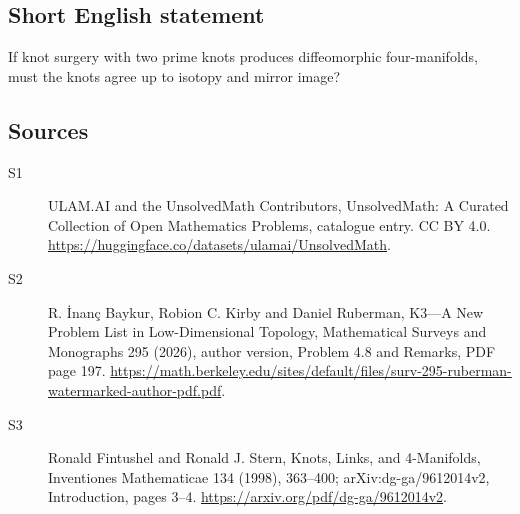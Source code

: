 \documentclass[11pt]{article}
\begin{document}
\subsection{Short English statement}
If knot surgery with two prime knots produces diffeomorphic four-manifolds, must the knots agree up to isotopy and mirror image?
\subsection{Sources}
\begin{description}
\item[\hypertarget{source:statement:1}{S1}] ULAM.AI and the UnsolvedMath Contributors, UnsolvedMath: A Curated Collection of Open Mathematics Problems, catalogue entry. CC BY 4.0. \url{https://huggingface.co/datasets/ulamai/UnsolvedMath}.
\item[\hypertarget{source:statement:2}{S2}] R. İnanç Baykur, Robion C. Kirby and Daniel Ruberman, K3—A New Problem List in Low-Dimensional Topology, Mathematical Surveys and Monographs 295 (2026), author version, Problem 4.8 and Remarks, PDF page 197. \url{https://math.berkeley.edu/sites/default/files/surv-295-ruberman-watermarked-author-pdf.pdf}.
\item[\hypertarget{source:statement:3}{S3}] Ronald Fintushel and Ronald J. Stern, Knots, Links, and 4-Manifolds, Inventiones Mathematicae 134 (1998), 363--400; arXiv:dg-ga/9612014v2, Introduction, pages 3--4. \url{https://arxiv.org/pdf/dg-ga/9612014v2}.
\end{description}
\label{end:statement}
\end{document}
